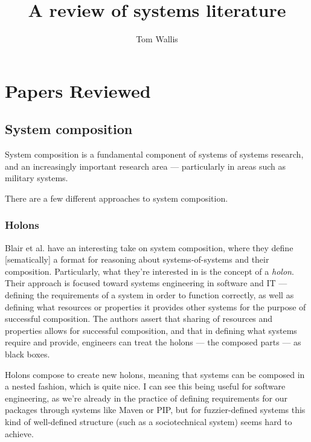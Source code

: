 \documentclass[12pt]{article}
\title{A review of systems literature}  %
\date{}
\author{Tom Wallis}
\begin{document}
\maketitle


\section{Papers Reviewed}  %

\subsection{System composition}

System composition is a fundamental component of systems of systems research,
and an increasingly important research area --- particularly in areas such as
military systems.\par

There are a few different approaches to system composition.

\subsubsection{Holons}\label{review:blair2015holons}


Blair et al.\cite{blair2015holons} have an interesting take on system
composition, where they define [sematically] a format for reasoning about
systems-of-systems and their composition. Particularly, what they're interested
in is the concept of a \emph{holon}. Their approach is focused toward systems
engineering in software and IT --- defining the requirements of a system in
order to function correctly, as well as defining what resources or properties it
provides other systems for the purpose of successful composition. The authors
assert that sharing of resources and properties allows for successful
composition, and that in defining what systems require and provide, engineers
can treat the holons --- the composed parts --- as black boxes.\par

Holons compose to create new holons, meaning that systems can be composed in a
nested fashion, which is quite nice. I can see this being useful for software
engineering, as we're already in the practice of defining requirements for our
packages through systems like Maven or PIP, but for fuzzier-defined systems this
kind of well-defined structure (such as a sociotechnical system) seems hard to
achieve.\par
\end{document}
